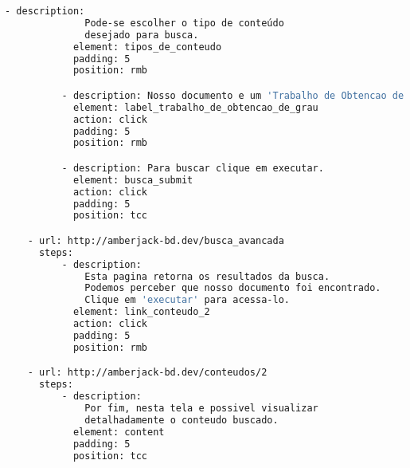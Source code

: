 {\begin{lstlisting}[caption=Cenário descrito em YAML,language=bash,label={lst:anexo_yaml}]
          - description:
              Pode-se escolher o tipo de conteúdo
              desejado para busca.
            element: tipos_de_conteudo
            padding: 5
            position: rmb

          - description: Nosso documento e um 'Trabalho de Obtencao de Grau'.
            element: label_trabalho_de_obtencao_de_grau
            action: click
            padding: 5
            position: rmb

          - description: Para buscar clique em executar.
            element: busca_submit
            action: click
            padding: 5
            position: tcc

    - url: http://amberjack-bd.dev/busca_avancada
      steps:
          - description:
              Esta pagina retorna os resultados da busca.
              Podemos perceber que nosso documento foi encontrado.
              Clique em 'executar' para acessa-lo.
            element: link_conteudo_2
            action: click
            padding: 5
            position: rmb

    - url: http://amberjack-bd.dev/conteudos/2
      steps:
          - description:
              Por fim, nesta tela e possivel visualizar
              detalhadamente o conteudo buscado.
            element: content
            padding: 5
            position: tcc
\end{lstlisting}
}